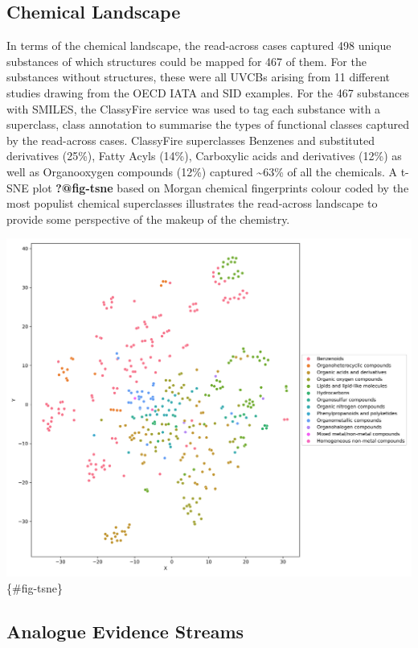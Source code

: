 \documentclass[
  super,
  preprint,
  3p]{elsarticle}
\begin{document}
\subsection{Chemical Landscape}\label{chemical-landscape}

In terms of the chemical landscape, the read-across cases captured 498
unique substances of which structures could be mapped for 467 of them.
For the substances without structures, these were all UVCBs arising from
11 different studies drawing from the OECD IATA and SID examples. For
the 467 substances with SMILES, the ClassyFire service was used to tag
each substance with a superclass, class annotation to summarise the
types of functional classes captured by the read-across cases.
ClassyFire superclasses Benzenes and substituted derivatives (25\%),
Fatty Acyls (14\%), Carboxylic acids and derivatives (12\%) as well as
Organooxygen compounds (12\%) captured \textasciitilde63\% of all the
chemicals. A t-SNE plot \textbf{?@fig-tsne} based on Morgan chemical
fingerprints colour coded by the most populist chemical superclasses
illustrates the read-across landscape to provide some perspective of the
makeup of the chemistry.

\includegraphics{tsne_df.png} \{\#fig-tsne\}

\subsection{Analogue Evidence Streams}\label{analogue-evidence-streams}
\end{document}
